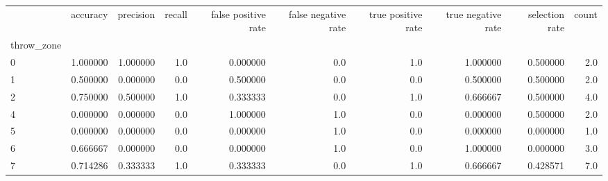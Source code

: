 \begin{tabular}{lrrrrrrrrr}
\toprule
{} &  accuracy &  precision &  recall &  false positive rate &  false negative rate &  true positive rate &  true negative rate &  selection rate &  count \\
throw\_zone &           &            &         &                      &                      &                     &                     &                 &        \\
\midrule
0          &  1.000000 &   1.000000 &     1.0 &             0.000000 &                  0.0 &                 1.0 &            1.000000 &        0.500000 &    2.0 \\
1          &  0.500000 &   0.000000 &     0.0 &             0.500000 &                  0.0 &                 0.0 &            0.500000 &        0.500000 &    2.0 \\
2          &  0.750000 &   0.500000 &     1.0 &             0.333333 &                  0.0 &                 1.0 &            0.666667 &        0.500000 &    4.0 \\
4          &  0.000000 &   0.000000 &     0.0 &             1.000000 &                  1.0 &                 0.0 &            0.000000 &        0.500000 &    2.0 \\
5          &  0.000000 &   0.000000 &     0.0 &             0.000000 &                  1.0 &                 0.0 &            0.000000 &        0.000000 &    1.0 \\
6          &  0.666667 &   0.000000 &     0.0 &             0.000000 &                  1.0 &                 0.0 &            1.000000 &        0.000000 &    3.0 \\
7          &  0.714286 &   0.333333 &     1.0 &             0.333333 &                  0.0 &                 1.0 &            0.666667 &        0.428571 &    7.0 \\
\bottomrule
\end{tabular}
